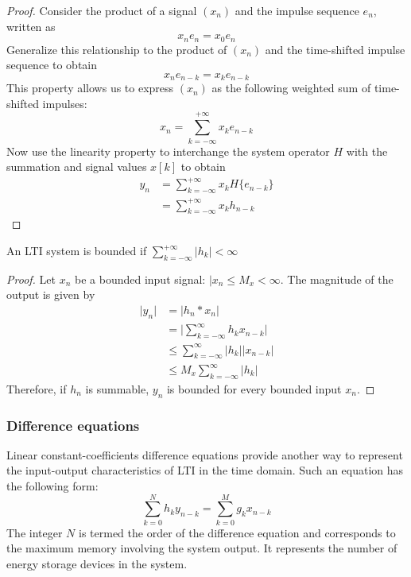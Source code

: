 \begin{proof} 
    Consider the product of a signal $(x_n)$ and the impulse sequence $e_n$, written as 
    \[
    x_ne_n = x_0e_n
    \]
    Generalize this relationship to the product of $(x_n)$ and the time-shifted impulse sequence to obtain 
    \[
    x_ne_{n-k} = x_ke_{n-k}
    \]
    This property allows us to express $(x_n)$ as the following weighted sum of time-shifted impulses:
    \[
    x_n = \sum_{k=-\infty}^{+\infty}x_ke_{n-k}
    \]
    Now use the linearity property to interchange the system operator $H$ with the summation and signal values $x[k]$ to obtain 
    \begin{align*}
        y_n &= \sum_{k=-\infty}^{+\infty}x_kH\{e_{n-k}\}\\
        &=\sum_{k=-\infty}^{+\infty}x_kh_{n-k}
    \end{align*}
\end{proof}

An LTI system is bounded if $\sum_{k=-\infty}^{+\infty}\vert h_k\vert < \infty$ 

\begin{proof} 
    Let $x_n$ be a bounded input signal: $\vert x_n \leq M_x < \infty$. The magnitude of the output is given by 
    \begin{align*}
        \vert y_n\vert &= \vert h_n\ast x_n\vert\\
        &=\big\vert \sum_{k=-\infty}^\infty h_kx_{n-k}\big\vert\\
        &\leq \sum_{k=-\infty}^\infty\vert h_k\vert \vert x_{n-k}\vert\\
        &\leq M_x\sum_{k=-\infty}^\infty\vert h_k\vert
    \end{align*}
    Therefore, if $h_n$ is summable, $y_n$ is bounded for every bounded input $x_n$. 
\end{proof}

\subsubsection{Difference equations}
Linear constant-coefficients difference equations provide another way to represent the input-output characteristics of LTI in the time domain. Such an equation has the following form:
\[
\sum_{k=0}^N h_ky_{n-k} = \sum_{k=0}^M g_kx_{n-k}
\]
The integer $N$ is termed the order of the difference equation and corresponds to the maximum memory involving the system output. It represents the number of energy storage devices in the system. 


